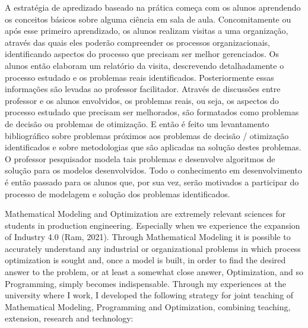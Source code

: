 \documentclass[preprint,12pt,authoryear]{elsarticle}
\begin{document}
A estratégia de apredizado baseado na prática começa com os alunos aprendendo os conceitos básicos sobre alguma ciência em sala de aula. Concomitamente ou após esse primeiro aprendizado, os alunos realizam visitas a uma organização, através das quais eles poderão compreender os processos organizacionais, identificando aspectos do processo que precisam ser melhor gerenciados. Os alunos então elaboram um relatório da visita, descrevendo detalhadamente o processo estudado e os problemas reais identificados. Posteriormente essas informações são levadas ao professor facilitador. Através de discussões entre professor e os alunos envolvidos, os problemas reais, ou seja, os aspectos do processo estudado que precisam ser melhorados, são formatados como problemas de decisão ou problemas de otimização. E então é feito um levantamento bibliográfico sobre problemas próximos aos problemas de decisão / otimização identificados e sobre metodologias que são aplicadas na solução destes problemas. O professor pesquisador modela tais problemas e desenvolve algoritmos de solução para os modelos desenvolvidos. Todo o conhecimento em desenvolvimento é então passado para os alunos que, por sua vez, serão motivados a participar do processo de modelagem e solução dos problemas identificados. 

Mathematical Modeling and Optimization are extremely relevant sciences for students in production engineering. Especially when we experience the expansion of Industry 4.0 (Ram, 2021). Through Mathematical Modeling it is possible to accurately understand any industrial or organizational problems in which process optimization is sought and, once a model is built, in order to find the desired answer to the problem, or at least a somewhat close answer, Optimization, and so Programming, simply becomes indispensable. Through my experiences at the university where I work, I developed the following strategy for joint teaching of
Mathematical Modeling, Programming and Optimization, combining teaching, extension, research and technology:
\end{document}
